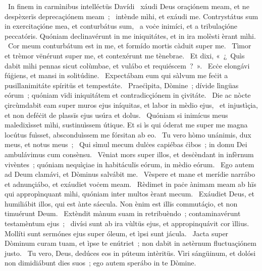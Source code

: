 {~In finem in carmìnibus intelléctüs Davídi}
{%
~xáudi Deus oraçiónem meam, et ne despèxerïs deprecaçiónem meam~;
~intènde mìhi, et exáudi me. Contrystátus sum in exercitaçióne mea, et conturbátus sum,
~a voċe inimíci, et a tribulaçióne peccatóris. Quóniam declinavérunt in me iniquitátes, et in ira molèsti èrant mìhi.
~Cor meum conturbátum est in me, et formído mortis càduit super me.
~Tìmor et trèmor vënérunt super me, et contexérunt me tènebrae.
~Et dixi, «~¿~Quìs dabit mìhi pennas sicut colùmbae, et vulábo et requiéscem~?~».
~Ecċe elongávi fúġiens, et mansi in solitúdine.
~Expectábam eum qui sàlvum me feċit a pusillanimitáte spíritüs et tempestáte.
~Praeċìpita, Dòmine~; dívide lìngüas eórum~; quóniam vïdi iniquitátem et contradicçiónem in çivitáte.
~Die ac nòcte çircùmdabit eam super muros ejus iníquitas, et labor in mèdio ejus,
~et injustìçia, et non deféċit de plassïs ejus usúra et dolus.
~Quóniam si inimícus meus maledixìsset mìhi, sustinuìssem útique. Et si ìs qui óderat me super me magna locútus fuìsset, absconduìssem me fórsitan ab eo.
~Tu vero hòmo unánimis, dux meus, et notus meus~;
~Qui sìmul mecum dulċes capiébas ċìbos~; in domu Dei ambulávimus cum consènsu.
~Vèniat mors super illos, et desċèndant in infèrnum vivèntes~; quóniam nequìçiae in habitáculïs eórum, in mèdio eórum.
~Ego autem ad Deum clamávi, et Dòminus salvábit me.
~Vèspere et mane et merídie narrábo et adnunçiábo, et exáudiet voċem meam.
~Rèdimet in paċe ànimam meam ab hïs qui appropìnquant mìhi, quóniam inter multos èrant mecum.
~Exáudiet Deus, et humiliábit illos, qui est ànte sáecula. Non ènim est illïs commutáçio, et non timuérunt Deum.
~Extèndit mànum suam in retribuèndo~; contaminavérunt testamèntum ejus~;
~divísi sunt ab ira vùltüs ejus, et appropinquávit cor ìllius. Mollíti sunt sermónes ejus super óleum, et ìpsi sunt jácula.
~Jacta super Dòminum curam tuam, et ìpse te enútriet~; non dabit in aetèrnum fluctuaçiónem justo.
~Tu vero, Deus, dedúces eos in púteum intèritüs. Vìri sángüinum, et dolósi non dimidiábunt dies suos~; ego autem sperábo in te Dòmine.}
